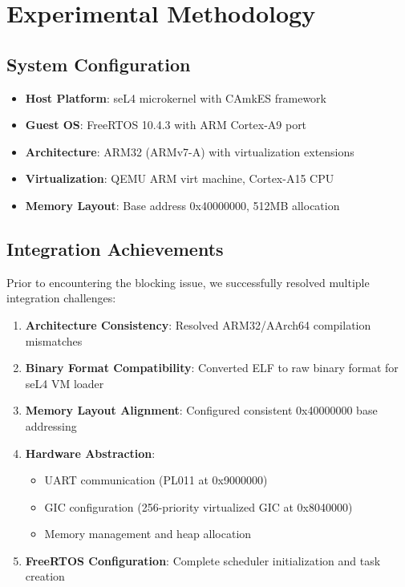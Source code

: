 \documentclass[11pt]{article}
\begin{document}
\section{Experimental Methodology}

\subsection{System Configuration}
\begin{itemize}
    \item \textbf{Host Platform}: seL4 microkernel with CAmkES framework
    \item \textbf{Guest OS}: FreeRTOS 10.4.3 with ARM Cortex-A9 port
    \item \textbf{Architecture}: ARM32 (ARMv7-A) with virtualization extensions
    \item \textbf{Virtualization}: QEMU ARM virt machine, Cortex-A15 CPU
    \item \textbf{Memory Layout}: Base address 0x40000000, 512MB allocation
\end{itemize}

\subsection{Integration Achievements}
Prior to encountering the blocking issue, we successfully resolved multiple integration challenges:

\begin{enumerate}
    \item \textbf{Architecture Consistency}: Resolved ARM32/AArch64 compilation mismatches
    \item \textbf{Binary Format Compatibility}: Converted ELF to raw binary format for seL4 VM loader
    \item \textbf{Memory Layout Alignment}: Configured consistent 0x40000000 base addressing
    \item \textbf{Hardware Abstraction}: 
        \begin{itemize}
            \item UART communication (PL011 at 0x9000000)
            \item GIC configuration (256-priority virtualized GIC at 0x8040000)
            \item Memory management and heap allocation
        \end{itemize}
    \item \textbf{FreeRTOS Configuration}: Complete scheduler initialization and task creation
\end{enumerate}
\end{document}
